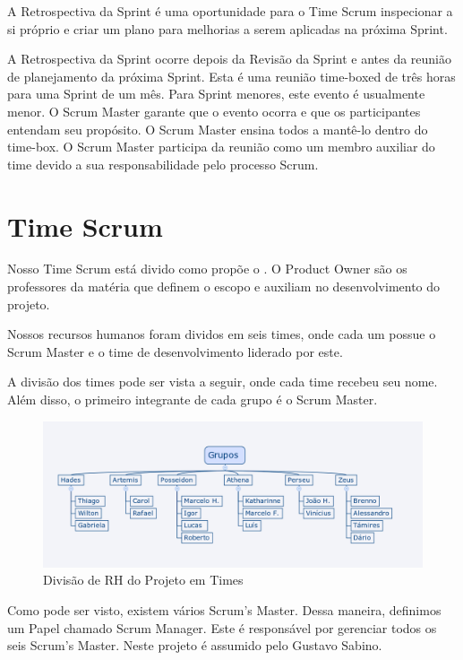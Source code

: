 A Retrospectiva da Sprint é uma oportunidade para o Time Scrum inspecionar a si próprio e
criar um plano para melhorias a serem aplicadas na próxima Sprint.

A Retrospectiva da Sprint ocorre depois da Revisão da Sprint e antes da reunião de
planejamento da próxima Sprint. Esta é uma reunião time-boxed de três horas para uma Sprint
de um mês. Para Sprint menores, este evento é usualmente menor. O Scrum Master garante
que o evento ocorra e que os participantes entendam seu propósito. O Scrum Master ensina
todos a mantê-lo dentro do time-box. O Scrum Master participa da reunião como um membro
auxiliar do time devido a sua responsabilidade pelo processo Scrum.

\section{Time Scrum}
\label{sec:Time Scrum}

Nosso Time Scrum está divido como propõe o \cite{guiaScrum}. O Product Owner são os
professores da matéria que definem o escopo e auxiliam no desenvolvimento do projeto.

Nossos recursos humanos foram dividos em seis times, onde cada um possue o Scrum Master
e o time de desenvolvimento liderado por este.

A divisão dos times pode ser vista a seguir, onde cada time recebeu seu nome. Além disso,
o primeiro integrante de cada grupo é o Scrum Master.

\begin{figure}[h]
  \centering
  \includegraphics[width=450px, scale=0.5]{figuras/timeScrum}
  \caption{Divisão de RH do Projeto em Times}
  \label{table:timeScrum}
\end{figure}

Como pode ser visto, existem vários Scrum's Master. Dessa maneira, definimos um Papel
chamado Scrum Manager. Este é responsável por gerenciar todos os seis Scrum's Master.
Neste projeto é assumido pelo Gustavo Sabino.
